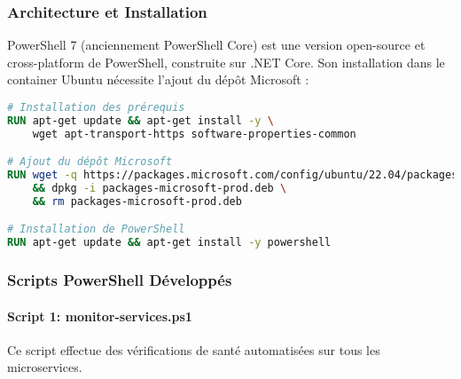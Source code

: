 \subsubsection{Architecture et Installation}
PowerShell 7 (anciennement PowerShell Core) est une version open-source et cross-platform de PowerShell, construite sur .NET Core. Son installation dans le container Ubuntu nécessite l'ajout du dépôt Microsoft :

\begin{lstlisting}[language=Dockerfile, caption=Installation de PowerShell dans le Dockerfile, basicstyle=\ttfamily\tiny]
# Installation des prérequis
RUN apt-get update && apt-get install -y \
    wget apt-transport-https software-properties-common

# Ajout du dépôt Microsoft
RUN wget -q https://packages.microsoft.com/config/ubuntu/22.04/packages-microsoft-prod.deb \
    && dpkg -i packages-microsoft-prod.deb \
    && rm packages-microsoft-prod.deb

# Installation de PowerShell
RUN apt-get update && apt-get install -y powershell
\end{lstlisting}

\subsubsection{Scripts PowerShell Développés}

\paragraph{Script 1: monitor-services.ps1}
Ce script effectue des vérifications de santé automatisées sur tous les microservices.

